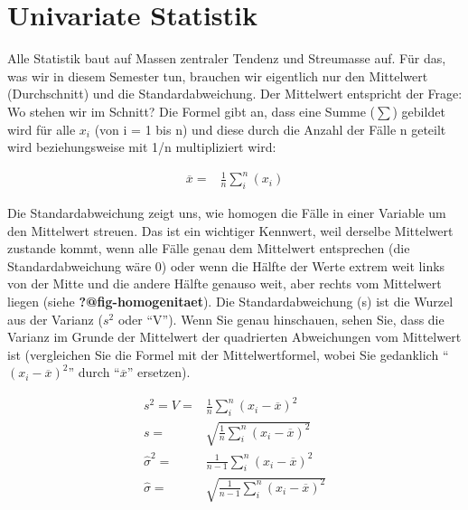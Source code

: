\documentclass[
  10pt,
  letterpaper,
  a4paper, twoside]{scrreprt}
\begin{document}
\section{Univariate Statistik}\label{univariate-statistik}

Alle Statistik baut auf Massen zentraler Tendenz und Streumasse auf. Für
das, was wir in diesem Semester tun, brauchen wir eigentlich nur den
Mittelwert (Durchschnitt) und die Standardabweichung. Der Mittelwert
entspricht der Frage: Wo stehen wir im Schnitt? Die Formel gibt an, dass
eine Summe (\(\sum\)) gebildet wird für alle \(x_i\) (von i = 1 bis n)
und diese durch die Anzahl der Fälle n geteilt wird beziehungsweise mit
1/n multipliziert wird:

\begin{align}
 \overline{x} = & \frac{1}{n}\sum_i^n(x_i)
\end{align}

Die Standardabweichung zeigt uns, wie homogen die Fälle in einer
Variable um den Mittelwert streuen. Das ist ein wichtiger Kennwert, weil
derselbe Mittelwert zustande kommt, wenn alle Fälle genau dem Mittelwert
entsprechen (die Standardabweichung wäre 0) oder wenn die Hälfte der
Werte extrem weit links von der Mitte und die andere Hälfte genauso
weit, aber rechts vom Mittelwert liegen (siehe
\textbf{?@fig-homogenitaet}). Die Standardabweichung (s) ist die Wurzel
aus der Varianz (\(s^2\) oder \enquote{V}). Wenn Sie genau hinschauen,
sehen Sie, dass die Varianz im Grunde der Mittelwert der quadrierten
Abweichungen vom Mittelwert ist (vergleichen Sie die Formel mit der
Mittelwertformel, wobei Sie gedanklich
\enquote{\((x_i-\overline{x})^2\)} durch \enquote{\(\overline{x}\)}
ersetzen).

\begin{align}
    s^2 = V = & \frac{1}{n} \sum_i^n(x_i-\overline{x})^2 \\    
    s  = & \sqrt{\frac{1}{n} \sum_i^n(x_i-\overline{x})^2}\\
    \hat{\sigma}^2 = & \frac{1}{n-1} \sum_i^n(x_i-\overline{x})^2\\
    \hat{\sigma} = & \sqrt{\frac{1}{n-1} \sum_i^n(x_i-\overline{x})^2}\\
\end{align}
\end{document}
